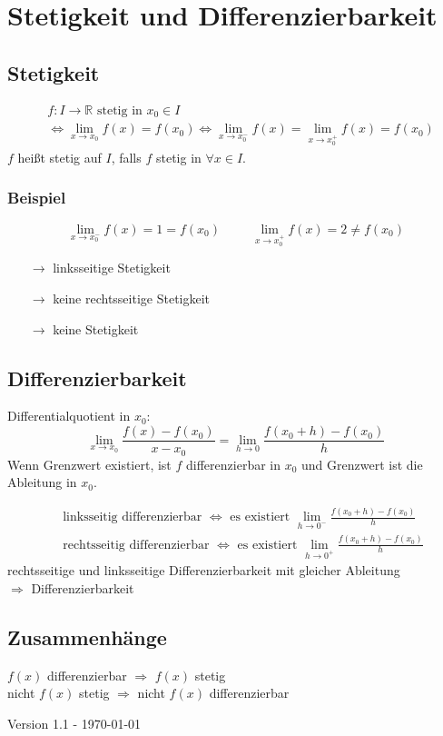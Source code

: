 \documentclass{scrartcl}
\begin{document}
	\section*{Stetigkeit und Differenzierbarkeit}
	\subsection*{Stetigkeit}
		
		\begin{align*}
			&f: I \to \mathbb{R} \text{ stetig in } x_0 \in I \\
			&\Leftrightarrow
				\lim\limits_{ x \to x_0 } f(x) = f(x_0)
			\Leftrightarrow
				\lim\limits_{ x \to x_0^- } f(x) = \lim\limits_{ x \to x_0^+ } f(x) = f(x_0)
		\end{align*}
		$f$ heißt stetig auf $I$, falls $f$ stetig in $\forall x \in I$.
		
		\subsubsection*{Beispiel}
		\[
			\lim\limits_{ x \to x_0^- } f(x) = 1 = f(x_0) 
			~~~~~~~~~~~
			\lim\limits_{ x \to x_0^+ } f(x) = 2 \neq f(x_0)
		\]
		
		\begin{itemize}
			\item[$\to$] linksseitige Stetigkeit 
			\item[$\to$] keine rechtsseitige Stetigkeit
			\item[$\to$] keine Stetigkeit 
		\end{itemize}
		
		\subsection*{Differenzierbarkeit}
		
		Differentialquotient in $x_0$:
		\[
			\lim\limits_{ x \to x_0 } \frac{f(x) - f(x_0)}{x - x_0} 
			=
			\lim\limits_{ h \to 0 } \frac{f(x_0+h) - f(x_0)}{h} 
		\]
		Wenn Grenzwert existiert, ist $f$ differenzierbar in $x_0$ und Grenzwert ist die Ableitung in $x_0$.
		
		\begin{align*}
			&\text{ linksseitig differenzierbar } \Leftrightarrow \text{ es existiert } \lim\limits_{ h \to 0^- } \frac{f(x_0+h) - f(x_0)}{h}
			\\
			&\text{ rechtsseitig differenzierbar } \Leftrightarrow \text{ es existiert } \lim\limits_{ h \to 0^+ } \frac{f(x_0+h) - f(x_0)}{h}
		\end{align*}
		rechtsseitige und linksseitige Differenzierbarkeit mit gleicher Ableitung\\
		\hspace*{2cm} $\Rightarrow$ Differenzierbarkeit
		
		\subsection*{Zusammenhänge}
			\begin{center}
				$f(x)$ differenzierbar $\Rightarrow$ $f(x)$ stetig
				\\
				nicht $f(x)$ stetig $\Rightarrow$ nicht $f(x)$ differenzierbar
			\end{center}

		{\tiny
			Version 1.1 - \today
		}
\end{document}
